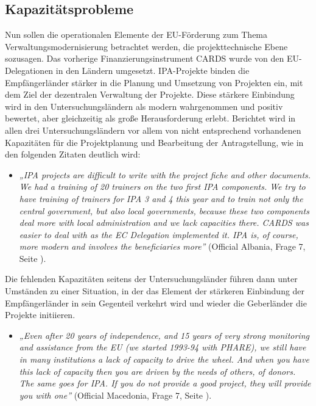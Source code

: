 \subsection{Kapazitätsprobleme}
Nun sollen die operationalen Elemente der EU-Förderung zum Thema Verwaltungsmodernisierung betrachtet werden, die projekttechnische Ebene sozusagen. Das vorherige Finanzierungsinstrument CARDS wurde von den EU-Delegationen in den Ländern umgesetzt. IPA-Projekte binden die Empfängerländer stärker in die Planung und Umsetzung von Projekten ein, mit dem Ziel der dezentralen Verwaltung der Projekte. Diese stärkere Einbindung wird in den Untersuchungsländern als modern wahrgenommen und positiv bewertet, aber gleichzeitig als große Herausforderung erlebt. Berichtet wird in allen drei Untersuchungsländern vor allem von nicht entsprechend vorhandenen Kapazitäten für die Projektplanung und Bearbeitung der Antragstellung, wie in den folgenden Zitaten deutlich wird:
\begin{itemize}[label={}]
\item \textit{„IPA projects are difficult to write with the project fiche and other documents. We had a training of 20 trainers on the two first IPA components. We try to have training of trainers for IPA 3 and 4 this year and to train not only the central government, but also local governments, because these two components deal more with local administration and we lack capacities there. CARDS was easier to deal with as the EC Delegation implemented it. IPA is, of course, more modern and involves the beneficiaries more”} (Official Albania, Frage 7, Seite \pageref{sec:par examples}).
\end{itemize}
Die fehlenden Kapazitäten seitens der Untersuchungsländer führen dann unter Umständen zu einer Situation, in der das Element der stärkeren Einbindung der Empfängerländer in sein Gegenteil verkehrt wird und wieder die Geberländer die Projekte initiieren.
\begin{itemize}[label={}]
\item \textit{„Even after 20 years of independence, and 15 years of very strong monitoring and assistance from the EU (we started 1993-94 with PHARE), we still have in many institutions a lack of capacity to drive the wheel. And when you have this lack of capacity then you are driven by the needs of others, of donors. The same goes for IPA. If you do not provide a good project, they will provide you with one”} (Official Macedonia, Frage 7, Seite \pageref{sec:par examples}).
\end{itemize}

